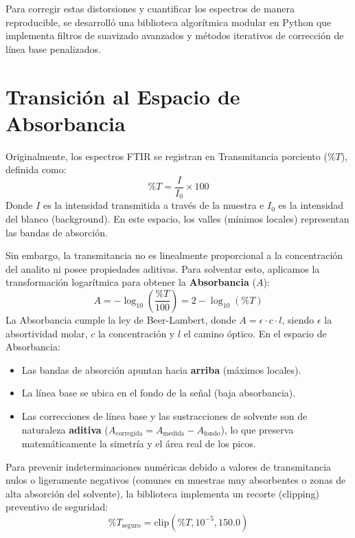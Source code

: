 \documentclass[a4paper,11pt]{article}
\begin{document}
Para corregir estas distorsiones y cuantificar los espectros de manera reproducible, se desarrolló una biblioteca algorítmica modular en Python que implementa filtros de suavizado avanzados y métodos iterativos de corrección de línea base penalizados.

\section{Transición al Espacio de Absorbancia}
Originalmente, los espectros FTIR se registran en Transmitancia porciento ($\%T$), definida como:
\begin{equation}
    \%T = \frac{I}{I_0} \times 100
\end{equation}
Donde $I$ es la intensidad transmitida a través de la muestra e $I_0$ es la intensidad del blanco (background). En este espacio, los valles (mínimos locales) representan las bandas de absorción. 

Sin embargo, la transmitancia no es linealmente proporcional a la concentración del analito ni posee propiedades aditivas. Para solventar esto, aplicamos la transformación logarítmica para obtener la \textbf{Absorbancia} ($A$):
\begin{equation}
    A = -\log_{10} \left( \frac{\%T}{100} \right) = 2 - \log_{10}(\%T)
\end{equation}
La Absorbancia cumple la ley de Beer-Lambert, donde $A = \epsilon \cdot c \cdot l$, siendo $\epsilon$ la absortividad molar, $c$ la concentración y $l$ el camino óptico. En el espacio de Absorbancia:
\begin{itemize}
    \item Las bandas de absorción apuntan hacia \textbf{arriba} (máximos locales).
    \item La línea base se ubica en el fondo de la señal (baja absorbancia).
    \item Las correcciones de línea base y las sustracciones de solvente son de naturaleza \textbf{aditiva} ($A_{\text{corregida}} = A_{\text{medida}} - A_{\text{fondo}}$), lo que preserva matemáticamente la simetría y el área real de los picos.
\end{itemize}

Para prevenir indeterminaciones numéricas debido a valores de transmitancia nulos o ligeramente negativos (comunes en muestras muy absorbentes o zonas de alta absorción del solvente), la biblioteca implementa un recorte (clipping) preventivo de seguridad:
\begin{equation}
    \%T_{\text{seguro}} = \text{clip}(\%T, 10^{-5}, 150.0)
\end{equation}
\end{document}
